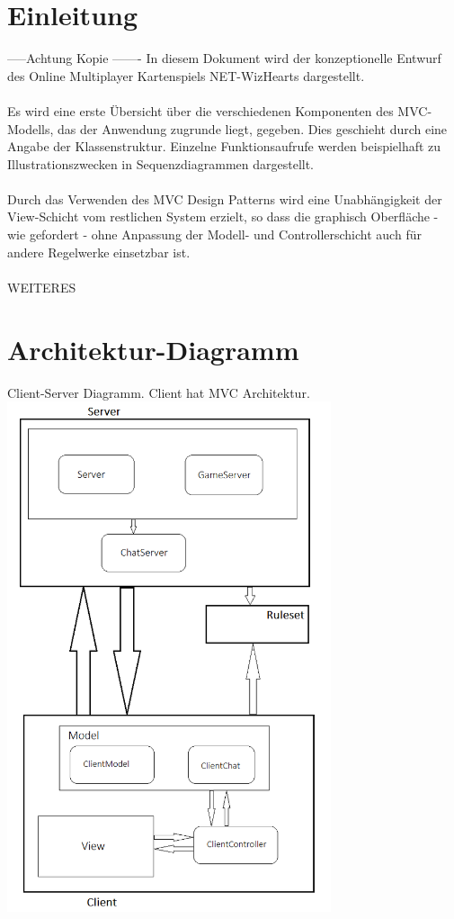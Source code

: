 \documentclass{article}
\begin{document}
\tableofcontents
\newpage

\section{Einleitung}
-----Achtung Kopie -------
In diesem Dokument wird der konzeptionelle Entwurf des Online Multiplayer Kartenspiels NET-WizHearts dargestellt.\\
\ \\
Es wird eine erste Übersicht über die verschiedenen Komponenten des MVC-
Modells, das der Anwendung zugrunde liegt, gegeben. Dies geschieht durch eine
Angabe der Klassenstruktur. Einzelne Funktionsaufrufe
werden beispielhaft zu Illustrationszwecken in Sequenzdiagrammen dargestellt.\\
\ \\
Durch das Verwenden des MVC Design Patterns wird eine Unabhängigkeit der View-Schicht 
vom restlichen System erzielt, so dass die graphisch Oberfläche - wie gefordert - ohne Anpassung 
der Modell- und Controllerschicht auch für andere Regelwerke einsetzbar ist.\\
\  \\
WEITERES


\section{Architektur-Diagramm}
Client-Server Diagramm. Client hat MVC Architektur.
\  \\
\includegraphics[height=15cm]{ArchitekturDiagramm}
\newpage
\end{document}
